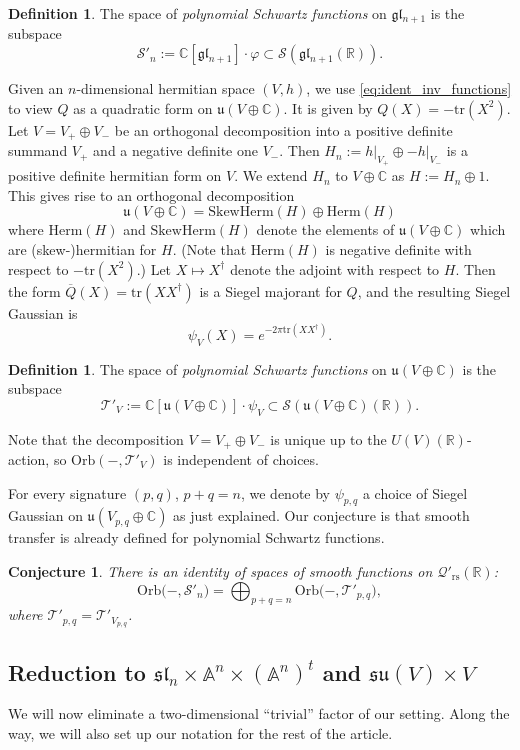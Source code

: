 \documentclass[reqno, 11pt]{amsart} %
\numberwithin{equation}{section}
\theoremstyle{plain}
\newtheorem{conjecture}[theorem]{Conjecture}
\theoremstyle{definition}
\newtheorem{definition}[theorem]{Definition}
\theoremstyle{remark}
\newcommand{\ov}{\overline}
\newcommand{\mr}{\mathrm}
\newcommand{\tr}{\mathrm{tr}}
\newcommand{\Herm}{\mr{Herm}}
\newcommand{\mbA}{\mathbb{A}}
\newcommand{\mbC}{\mathbb{C}}
\newcommand{\mbR}{\mathbb{R}}
\newcommand{\mcQ}{\mathcal{Q}}
\newcommand{\mcS}{\mathcal{S}}
\newcommand{\mcT}{\mathcal{T}}
\newcommand{\mfg}{\mathfrak{g}}
\newcommand{\mfl}{\mathfrak{l}}
\newcommand{\mfs}{\mathfrak{s}}
\newcommand{\mfu}{\mathfrak{u}}
\newcommand{\rs}{\mr{rs}}
\newcommand{\mfgl}{\mfg\mfl}
\newcommand{\mfsl}{\mfs\mfl}
\newcommand{\mfsu}{\mfs\mfu}
\newcommand{\bbC}{\mathbb C}
\newcommand{\lie}[1]{ \mathfrak{#1}}
\newcommand{\Orb}{\mathrm{Orb}}
\begin{document}
\begin{definition}\label{def:pol_Schwartz_gl}
The space of \emph{polynomial Schwartz functions} on $\mfgl_{n+1}$ is the subspace
$$\mathcal S'_n := \mbC[\mfgl_{n+1}]\cdot φ \subset \mcS(\mfgl_{n+1}(\mbR)).$$
\end{definition}
Given an $n$-dimensional hermitian space $(V,h)$, we use \eqref{eq:ident_inv_functions} to view $Q$ as a quadratic form on $\mfu(V\oplus \mbC)$. It is given by $Q(X) = -\tr(X^2)$. Let $V = V_+ \oplus V_-$ be an orthogonal decomposition into a positive definite summand $V_+$ and a negative definite one $V_-$. Then $H_n := h\vert_{V_+} \oplus -h\vert_{V_-}$ is a positive definite hermitian form on $V$. We extend $H_n$ to $V\oplus \mbC$ as $H := H_n\oplus 1$. This gives rise to an orthogonal decomposition
 	\[
\lie u (V \oplus \bbC) =  \mathrm{SkewHerm}(H) \oplus \Herm(H)
\]
where $\Herm(H)$ and $\mr{SkewHerm}(H)$ denote the elements of $\mfu(V\oplus \mbC)$ which are (skew-)hermitian for $H$. (Note that $\Herm(H)$ is negative definite with respect to $-\tr(X^2)$.) Let $X \mapsto X^{\dagger}$ denote the adjoint with respect to $H$. Then the form $\ov Q(X)= \tr(X X^{\dagger})$ is a Siegel majorant for $Q$, and the resulting Siegel Gaussian is
$$ψ_V(X) = e^{-2π\tr(XX^\dagger)}.$$
\begin{definition}	The space of \emph{polynomial Schwartz functions} on $\lie u(V \oplus \bbC)$ is the subspace
$$  \mathcal T'_{V} := \mbC[\lie u(V \oplus \bbC)]\cdot \psi_V \subset \mcS(\lie u(V \oplus \bbC)(\mbR)).$$
\end{definition}
Note that the decomposition $V = V_+ \oplus V_-$ is unique up to the $U(V)(\mbR)$-action, so $\Orb(-,\mcT'_V)$ is independent of choices.

For every signature $(p,q)$, $p+q = n$, we denote by $ψ_{p,q}$ a choice of Siegel Gaussian on $\mfu(V_{p,q}\oplus \mbC)$ as just explained. Our conjecture is that smooth transfer is already defined for polynomial Schwartz functions.
\begin{conjecture}\label{conj:polynomial_Schwartz}
There is an identity of spaces of smooth functions on $\mcQ'_\rs(\mbR)$:
$$\Orb\big(-,\mathcal S'_n\big) = \bigoplus_{p + q = n} \Orb\big(-, \mathcal T'_{p,q}\big),$$
where $\mathcal T'_{p,q} = \mathcal T'_{V_{p,q}}$.
\end{conjecture}


\subsection{Reduction to $\mfsl_n\times \mbA^n\times (\mbA^n)^t$ and $\mfsu(V)\times V$}\label{ss:reduction_trace_0}
We will now eliminate a two-dimensional ``trivial'' factor of our setting. Along the way, we will also set up our notation for the rest of the article.
\end{document}
